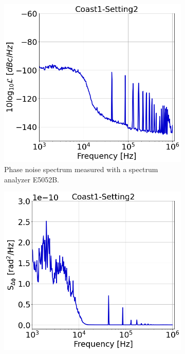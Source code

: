 \begin{figure}[!ht]
    \centering
    \begin{subfigure}[t]{0.42\textwidth}
        \centering
        \includegraphics[width=1\textwidth]{./images/app_B/coast1_setting2_v1.png}
        \caption{Phase noise spectrum measured with a spectrum analyzer E5052B.}
        \label{fig:coast1_setting2_a}
    \end{subfigure}
    \hfill
    \begin{subfigure}[t]{0.42\textwidth}
        \centering
        \includegraphics[width=1 \textwidth]{./images/app_B/coast1_setting2_v2.png}

\end{subfigure}
\end{figure}
